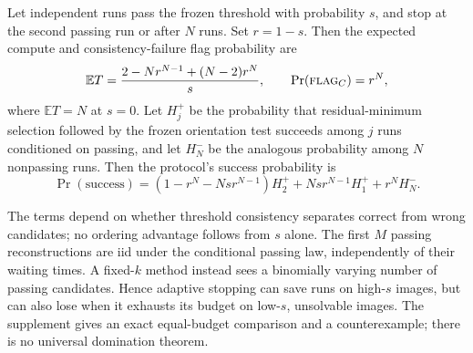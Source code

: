 \begin{proposition}
\label{prop:gtfree-stop}
Let independent runs pass the frozen threshold with probability $s$, and
stop at the second passing run or after $N$ runs. Set $r=1-s$.
Then the expected compute and consistency-failure flag probability are
\begin{equation}
\label{eq:protocol-stop-compute}
\mathbb E T=\frac{2-Nr^{N-1}+(N-2)r^N}{s},\qquad
\Pr(\textsc{flag}_C)=r^N,
\end{equation}
where $\mathbb ET=N$ at $s=0$. Let $H_j^+$ be the probability that
residual-minimum selection followed by the frozen orientation test
succeeds among $j$ runs conditioned on passing, and let $H_N^-$
be the analogous probability among $N$ nonpassing runs.
Then the protocol's success probability is
\begin{equation}
\label{eq:protocol-stop-success}
\Pr(\mathrm{success})=
(1-r^N-Nsr^{N-1})H_2^++Nsr^{N-1}H_1^++r^NH_N^-.
\end{equation}
\end{proposition}
The terms depend on whether threshold consistency separates correct
from wrong candidates; no ordering advantage follows from $s$ alone.
The first $M$ passing reconstructions are iid under the conditional
passing law, independently of their waiting times. A fixed-$k$ method
instead sees a binomially varying number of passing candidates. Hence
adaptive stopping can save runs on high-$s$ images, but can also lose
when it exhausts its budget on low-$s$, unsolvable images. The
supplement gives an exact equal-budget comparison and a counterexample;
there is no universal domination theorem.
